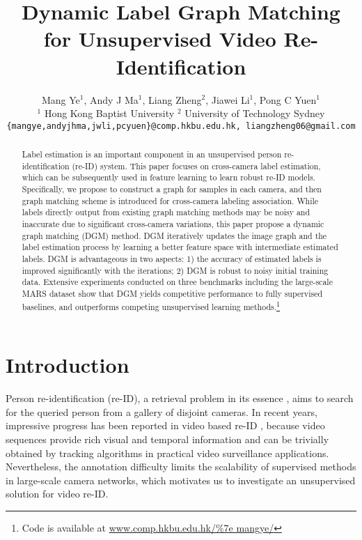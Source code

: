 \documentclass[10pt,twocolumn,letterpaper]{article}
\begin{document}
\title{Dynamic Label Graph Matching for Unsupervised Video Re-Identification}

\author{Mang Ye$^{1}$, Andy J Ma$^{1}$, Liang Zheng$^{2}$, Jiawei Li$^{1}$, Pong C Yuen$^{1}$ \\
$^{1}$ Hong Kong Baptist University \quad \quad $^{2}$ University of Technology Sydney \\
{\tt\small \{mangye,andyjhma,jwli,pcyuen\}@comp.hkbu.edu.hk, liangzheng06@gmail.com}
}

\maketitle
\thispagestyle{empty}

\begin{abstract}

Label estimation is an important component in an unsupervised person re-identification (re-ID) system. This paper focuses on cross-camera label estimation, which can be subsequently used in feature learning to learn robust re-ID models. Specifically, we propose to construct a graph for samples in each camera, and then graph matching scheme is introduced for cross-camera labeling association. While labels directly output from existing graph matching methods may be noisy and inaccurate due to significant cross-camera variations, this paper propose a dynamic graph matching (DGM) method. DGM iteratively updates the image graph and the label estimation process by learning a better feature space with intermediate estimated labels. DGM is advantageous in two aspects: 1) the accuracy of estimated labels is improved significantly with the iterations; 2) DGM is robust to noisy initial training data. Extensive experiments conducted on three benchmarks including the large-scale MARS dataset show that DGM yields competitive performance to fully supervised baselines, and outperforms competing unsupervised learning methods.\footnote{Code is available at \url{www.comp.hkbu.edu.hk/\%7e mangye/}}

\end{abstract}

\section{Introduction}
Person re-identification (re-ID), a retrieval problem in its essence \cite{zheng2017sift,tmm16rank,arxiv17survey}, aims to search for the queried person from a gallery of disjoint cameras. In recent years, impressive progress has been reported in video based re-ID \cite{cvpr16top,cvpr16video,eccv16mars}, because video sequences provide rich visual and temporal information and can be trivially obtained by tracking algorithms \cite{tip15track,aaai17track} in practical video surveillance applications. Nevertheless, the annotation difficulty limits the scalability of supervised methods in large-scale camera networks, which motivates us to investigate an unsupervised solution for video re-ID.
\end{document}
